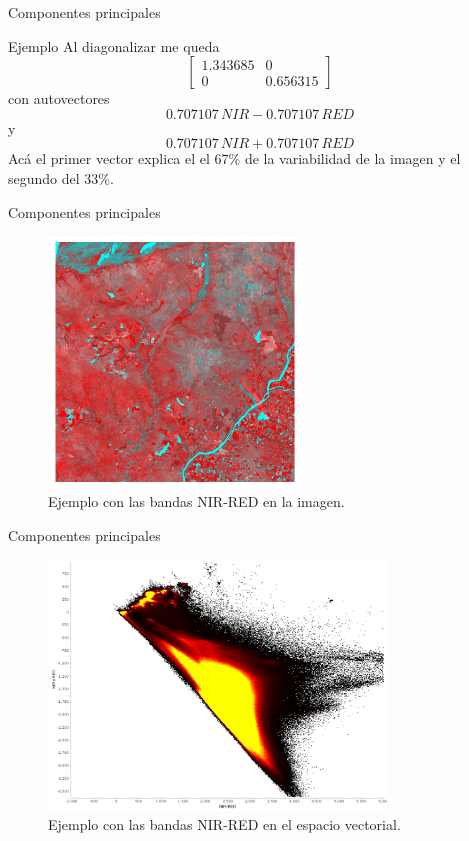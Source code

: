 \documentclass[handout]{beamer}
\begin{document}
\begin{frame}{Componentes principales}
  \begin{exampleblock}{Ejemplo}
    Al diagonalizar me queda
    \[
    \begin{bmatrix}
        1.343685       & 0 \\
        0       & 0.656315
    \end{bmatrix} \]
    con autovectores $$0.707107\, NIR-0.707107 \, RED$$  y $$0.707107 \, NIR+0.707107\, RED$$ \pause
    Acá el primer vector explica el el 67\% de la variabilidad de la imagen y el segundo del 33\%.
  \end{exampleblock}
\end{frame}

\begin{frame}{Componentes principales}
  \begin{figure}
  \centering
  \includegraphics[width=0.6\textwidth]{imagenes/pca1.png}
  \caption{Ejemplo con las bandas NIR-RED en la imagen.}
  \end{figure}
\end{frame}

\begin{frame}{Componentes principales}
  \begin{figure}
  \centering
  \includegraphics[width=0.8\textwidth]{imagenes/pca2.png}
  \caption{Ejemplo con las bandas NIR-RED en el espacio vectorial.}
  \end{figure}
\end{frame}
\end{document}
